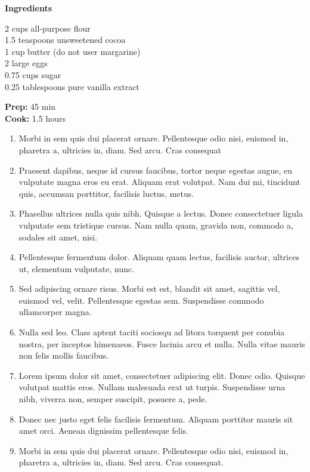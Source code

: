 \documentclass[a4paper]{article}
\newcommand{\ingredient}[1]{
  \vspace{0.1cm}
  \hspace{0cm}
  {#1}\\
}
\newcommand{\prep}[1]{
  \textbf{Prep:} {#1}\\
}
\newcommand{\cooking}[1]{
  \textbf{Cook:} {#1}\\
}
\begin{document}
\begin{multicols}{3}
  \normalsize
  \raggedright
  \textbf{Ingredients}\\
  \vspace{0.2cm}
  \ingredient{2 cups all-purpose flour}
  \ingredient{1.5 teaspoons unsweetened cocoa}
  \ingredient{1 cup butter (do not user margarine)}
  \ingredient{2 large eggs}
  \ingredient{0.75 cups sugar}
  \ingredient{0.25 tablespoons pure vanilla extract}
  \vspace{0.5cm}
  \prep{45 min} %
  \cooking{1.5 hours} %
  \columnbreak
  \begin{enumerate}[leftmargin=0.3cm]
    \item{Morbi in sem quis dui placerat ornare. Pellentesque odio nisi, euismod in, pharetra a, ultricies in, diam. Sed arcu. Cras consequat} %
    \item Praesent dapibus, neque id cursus faucibus, tortor neque egestas augue, eu vulputate magna eros eu erat. Aliquam erat volutpat. Nam dui mi, tincidunt quis, accumsan porttitor, facilisis luctus, metus.
    \item Phasellus ultrices nulla quis nibh. Quisque a lectus. Donec consectetuer ligula vulputate sem tristique cursus. Nam nulla quam, gravida non, commodo a, sodales sit amet, nisi.
    \item Pellentesque fermentum dolor. Aliquam quam lectus, facilisis auctor, ultrices ut, elementum vulputate, nunc.
    \item Sed adipiscing ornare risus. Morbi est est, blandit sit amet, sagittis vel, euismod vel, velit. Pellentesque egestas sem. Suspendisse commodo ullamcorper magna.
    \item Nulla sed leo. Class aptent taciti sociosqu ad litora torquent per conubia nostra, per inceptos himenaeos.
          Fusce lacinia arcu et nulla. Nulla vitae mauris non felis mollis faucibus.
    \item Lorem ipsum dolor sit amet, consectetuer adipiscing elit. Donec odio. Quisque volutpat mattis eros. Nullam malesuada erat ut turpis. Suspendisse urna nibh, viverra non, semper suscipit, posuere a, pede.
    \item Donec nec justo eget felis facilisis fermentum. Aliquam porttitor mauris sit amet orci. Aenean dignissim pellentesque felis.
    \item Morbi in sem quis dui placerat ornare. Pellentesque odio nisi, euismod in, pharetra a, ultricies in, diam. Sed arcu. Cras consequat.
  \end{enumerate}
\end{multicols}
\end{document}
